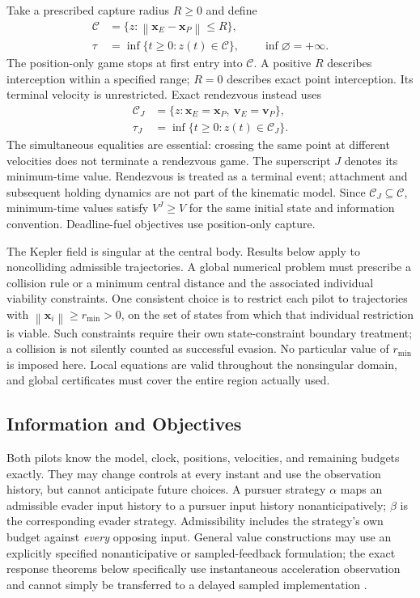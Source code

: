 \documentclass[journal,a4paper]{IEEEtran}
\newcommand{\C}{\mathcal C}
\newcommand{\norm}[1]{\left\|#1\right\|}
\begin{document}
Take a prescribed capture radius $R\ge0$ and define
\begin{align}
 \C&=\{z:\norm{\mathbf x_E-\mathbf x_P}\le R\},\label{eq:target}\\
 \tau&=\inf\{t\ge0:z(t)\in\C\},\qquad \inf\varnothing=+\infty.
 \label{eq:tau}
\end{align}
The position-only game stops at first entry into $\C$. A positive $R$ describes interception within a specified range; $R=0$ describes exact point interception. Its terminal velocity is unrestricted. Exact rendezvous instead uses
\begin{align}
 \C_J&=\{z:\mathbf x_E=\mathbf x_P,\ \mathbf v_E=\mathbf v_P\},\label{eq:boardingtarget}\\
 \tau_J&=\inf\{t\ge0:z(t)\in\C_J\}.\label{eq:tauJ}
\end{align}
The simultaneous equalities are essential: crossing the same point at different velocities does not terminate a rendezvous game. The superscript $J$ denotes its minimum-time value. Rendezvous is treated as a terminal event; attachment and subsequent holding dynamics are not part of the kinematic model. Since $\C_J\subseteq\C$, minimum-time values satisfy $V^J\ge V$ for the same initial state and information convention. Deadline-fuel objectives use position-only capture.

The Kepler field is singular at the central body. Results below apply to noncolliding admissible trajectories. A global numerical problem must prescribe a collision rule or a minimum central distance and the associated individual viability constraints. One consistent choice is to restrict each pilot to trajectories with $\norm{\mathbf x_i}\ge r_{\min}>0$, on the set of states from which that individual restriction is viable. Such constraints require their own state-constraint boundary treatment; a collision is not silently counted as successful evasion. No particular value of $r_{\min}$ is imposed here. Local equations are valid throughout the nonsingular domain, and global certificates must cover the entire region actually used.

\subsection{Information and Objectives}
Both pilots know the model, clock, positions, velocities, and remaining budgets exactly. They may change controls at every instant and use the observation history, but cannot anticipate future choices. A pursuer strategy $\alpha$ maps an admissible evader input history to a pursuer input history nonanticipatively; $\beta$ is the corresponding evader strategy. Admissibility includes the strategy's own budget against \emph{every} opposing input. General value constructions may use an explicitly specified nonanticipative or sampled-feedback formulation; the exact response theorems below specifically use instantaneous acceleration observation and cannot simply be transferred to a delayed sampled implementation \cite{EvansSouganidis1984}.
\end{document}
